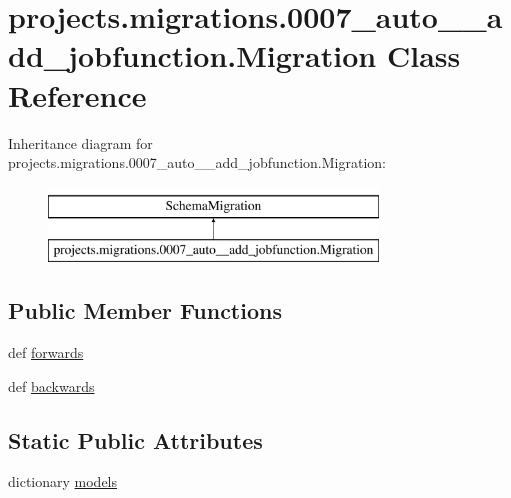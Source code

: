 \hypertarget{classprojects_1_1migrations_1_10007__auto____add__jobfunction_1_1_migration}{\section{projects.\-migrations.0007\-\_\-auto\-\_\-\-\_\-add\-\_\-jobfunction.Migration Class Reference}
\label{classprojects_1_1migrations_1_10007__auto____add__jobfunction_1_1_migration}
}
Inheritance diagram for projects.\-migrations.0007\-\_\-auto\-\_\-\-\_\-add\-\_\-jobfunction.Migration\-:\begin{figure}[H]
\begin{center}
\leavevmode
\includegraphics[height=2.000000cm]{classprojects_1_1migrations_1_10007__auto____add__jobfunction_1_1_migration}
\end{center}
\end{figure}
\subsection*{Public Member Functions}
\begin{DoxyCompactItemize}
\item 
def \hyperlink{classprojects_1_1migrations_1_10007__auto____add__jobfunction_1_1_migration_a8668e80746e46fe4f362b3a77ad4bdb8}{forwards}
\item 
def \hyperlink{classprojects_1_1migrations_1_10007__auto____add__jobfunction_1_1_migration_a33ef6752f4db24b92ba5dc4f1aa05fce}{backwards}
\end{DoxyCompactItemize}
\subsection*{Static Public Attributes}
\begin{DoxyCompactItemize}
\item 
dictionary \hyperlink{classprojects_1_1migrations_1_10007__auto____add__jobfunction_1_1_migration_ad8c2b691d06f68b72d9971bb6a8f45cf}{models}
\end{DoxyCompactItemize}


